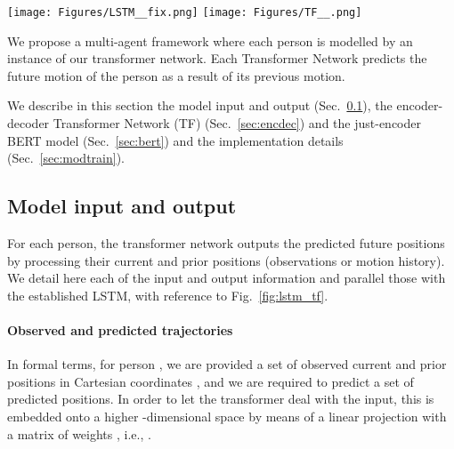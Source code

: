 \documentclass[a4paper,conference]{IEEEtran}
\begin{document}
\begin{figure*}[!t]
\centering
  \texttt{[image: Figures/LSTM\_\_fix.png]}
  \texttt{[image: Figures/TF\_\_.png]}
\vspace{-0.5cm}
\caption{Model illustration of LSTM~(\textit{left}) and TF~(\textit{right}). At each time step, LSTM leverages the current-frame information and its hidden state. By contrast, TF leverages the encoder representation of the observed input positions and the previously predicted outputs. In purple and grey are the self-attention and encoder-decoder attention modules, that allow TF to learn on which past position it needs to focus to predict a correct trajectory.
}
\label{fig:lstm_tf}
\vspace{-0.2cm}
\end{figure*}

















We propose a multi-agent framework where each person is modelled by an instance of our transformer network. Each Transformer Network predicts the future motion of the person as a result of its previous motion.

We describe in this section the model input and output (Sec.~\ref{sec:inout}), the encoder-decoder Transformer Network (TF) (Sec.~\ref{sec:encdec}) and the just-encoder BERT model (Sec.~\ref{sec:bert}) and the implementation details (Sec.~\ref{sec:modtrain}). 



\subsection{Model input and output}\label{sec:inout}

For each person, the transformer network outputs the predicted future positions by processing their current and prior positions (observations or motion history). We detail here each of the input and output information and parallel those with the established LSTM, with reference to Fig.~\ref{fig:lstm_tf}.




\paragraph{Observed and predicted trajectories}
In formal terms, for person , we are provided a set  of  observed current and prior positions in Cartesian coordinates , and we are required to predict a set  of  predicted positions. In order to let the transformer deal with the input, this is embedded onto a higher -dimensional space by means of a linear projection with a matrix of weights , i.e., .
\end{document}
